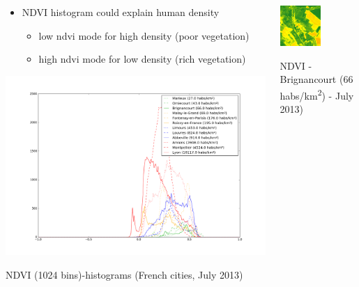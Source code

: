 \documentclass[c]{beamer}
\begin{document}
\begin{frame}

\begin{columns}
 \begin{column}{0.75\textwidth}
 
 \begin{overlayarea}{\linewidth}{2cm}
 \begin{itemize}
 \item NDVI histogram could explain human density
 \begin{itemize}
  \item \scriptsize low ndvi mode for high density (poor vegetation)
  \item \scriptsize high ndvi mode for low density (rich vegetation)
 \end{itemize}
 \end{itemize}
 \end{overlayarea}

  \begin{overlayarea}{\linewidth}{4.5cm}
  \centering\vfill
  \includegraphics[scale=0.17]{images/ndvi/ndvi_categorie.png}
  \end{overlayarea}
  \begin{overlayarea}{\linewidth}{0.5cm}
  \centering
  \tiny NDVI (1024 bins)-histograms (French cities, July 2013) \par
  \end{overlayarea}
  
 \end{column}
 \begin{column}{0.25\textwidth}
 
 \begin{overlayarea}{\linewidth}{0.5cm}
  \centering\vfill
  \includegraphics[scale=0.17]{images/Brignancourt/07_ndvi.png}
  \end{overlayarea}
  \begin{overlayarea}{\linewidth}{0.5cm}
  \centering
  \tiny NDVI - Brignancourt (66 habs/km\textsuperscript{2}) - July 2013) \par
  \end{overlayarea}
  

\end{column}
\end{columns}
\end{frame}
\end{document}
